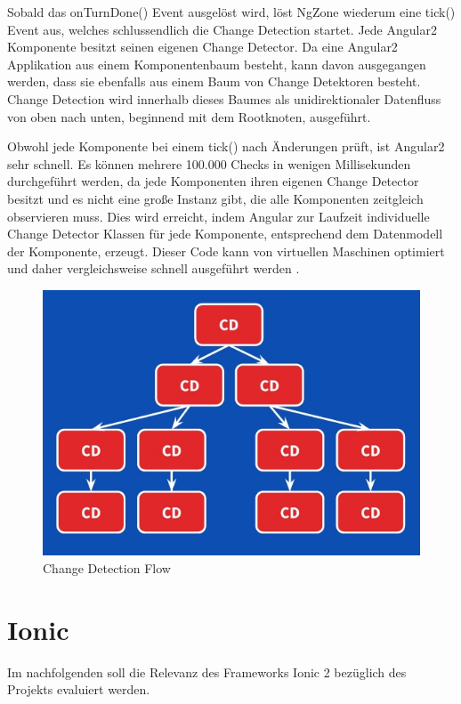 Sobald das onTurnDone() Event ausgelöst wird, löst NgZone wiederum eine tick() Event aus, welches schlussendlich die Change Detection startet.
Jede Angular2 Komponente besitzt seinen eigenen Change Detector. Da eine Angular2 Applikation aus einem Komponentenbaum besteht,
kann davon ausgegangen werden, dass sie ebenfalls aus einem Baum von Change Detektoren besteht.
Change Detection wird innerhalb dieses Baumes als unidirektionaler Datenfluss von oben nach unten, beginnend mit dem Rootknoten, ausgeführt.

Obwohl jede Komponente bei einem tick() nach Änderungen prüft, ist Angular2 sehr schnell. Es können mehrere 100.000 Checks in wenigen Millisekunden durchgeführt werden,
da jede Komponenten ihren eigenen Change Detector besitzt und es nicht eine große Instanz gibt, die alle Komponenten zeitgleich observieren muss.
Dies wird erreicht, indem Angular zur Laufzeit individuelle Change Detector Klassen für jede Komponente, entsprechend dem Datenmodell der Komponente, erzeugt.
Dieser Code kann von virtuellen Maschinen optimiert und daher vergleichsweise schnell ausgeführt werden \cite{changedetection-explained}.

\vspace{1cm}

\begin{figure}[ht]
 \centering
 \includegraphics[width=0.7\linewidth]{kapitel3/cd-tree.jpg}
 \caption{Change Detection Flow \cite{changedetection-explained}}
\end{figure}

\newpage
\section{Ionic}

Im nachfolgenden soll die Relevanz des Frameworks Ionic 2 bezüglich des Projekts \projectname{} evaluiert werden.

